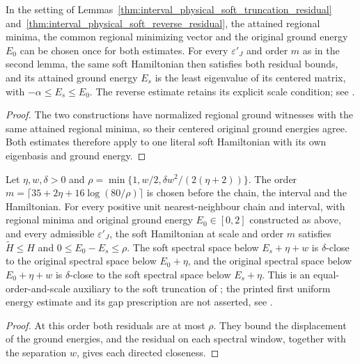 \begin{lemma}
    \label{thm:interval_physical_soft_common_residuals}
    \leanok
    In the setting of Lemmas~\ref{thm:interval_physical_soft_truncation_residual}
    and~\ref{thm:interval_physical_soft_reverse_residual}, the attained
    regional minima, the common regional minimizing vector and the
    original ground energy $E_0$ can be chosen once for both estimates.
    For every $\varepsilon'_J$ and order $m$ as in the second lemma, the
    same soft Hamiltonian then satisfies both residual bounds, and its
    attained ground energy $E_s$ is the least eigenvalue of its centered
    matrix, with $-\alpha\le E_s\le E_0$. The reverse estimate retains its
    explicit scale condition; see
    \cite{gap:alvv16_soft_truncation_energy_estimate}.
\end{lemma}
\begin{proof}\leanok
    The two constructions have normalized regional ground witnesses with
    the same attained regional minima, so their centered original ground
    energies agree. Both estimates therefore apply to one literal soft
    Hamiltonian with its own eigenbasis and ground energy.
\end{proof}

\begin{lemma}
    \label{thm:interval_physical_soft_low_energy_closeness}
    \leanok
    Let $\eta,w,\delta>0$ and
    $\rho=\min\{1,w/2,\delta w^2/(2(\eta+2))\}$. The order
    $m=\lceil35+2\eta+16\log(80/\rho)\rceil$ is chosen before the chain,
    the interval and the Hamiltonian. For every positive unit
    nearest-neighbour chain and interval, with regional minima and original
    ground energy $E_0\in[0,2]$ constructed as above, and every admissible
    $\varepsilon'_J$, the soft Hamiltonian at scale and order $m$ satisfies
    $\widetilde H\le H$ and $0\le E_0-E_s\le\rho$. The soft spectral space
    below $E_s+\eta+w$ is $\delta$-close to the original spectral space
    below $E_0+\eta$, and the original spectral space below $E_0+\eta+w$
    is $\delta$-close to the soft spectral space below $E_s+\eta$.
    This is an equal-order-and-scale auxiliary to the soft truncation of
    \cite{Arad2016RigorousRG}; the printed first uniform energy estimate
    and its gap prescription are not asserted, see
    \cite{gap:alvv16_soft_truncation_energy_estimate}.
\end{lemma}
\begin{proof}\leanok
    At this order both residuals are at most $\rho$. They bound the
    displacement of the ground energies, and the residual on each spectral
    window, together with the separation $w$, gives each directed
    closeness.
\end{proof}
